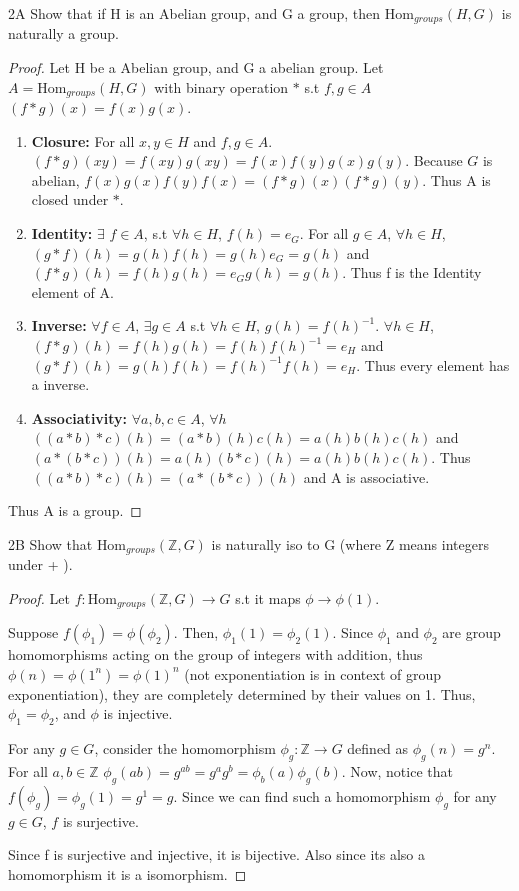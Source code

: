 \documentclass{article}
\newcommand{\Z}{\mathbb{Z}}
\newcommand{\Hom}[0]{\text{Hom}}
\begin{document}
\bigskip

\begin{claim}{2A}
    Show that if H is an Abelian group, and G a group, then $\Hom_{groups}(H,G)$ is naturally a group. 
\end{claim}
\begin{proof}
    Let H be a Abelian group, and G a abelian group. Let $A = \Hom_{groups}(H,G)$ with binary operation $\ast$ s.t $f, g \in A$ $(f \ast g)(x) = f(x)g(x)$. 
    
    \begin{enumerate}{}
        \item \textbf{Closure: } For all $x, y \in H$ and $f, g \in A$. $(f \ast g)(xy) = f(xy)g(xy) = f(x)f(y)g(x)g(y)$. Because $G$ is abelian, $f(x)g(x)f(y)f(x) = (f \ast g)(x)(f\ast g)(y)$. Thus A is closed under $\ast$.
        \item \textbf{Identity: } $\exists $ $f \in A$, s.t $\forall h \in H$, $f(h) = e_G$. For all $g \in A$, $\forall h \in H$, $(g \ast f)(h) = g(h)f(h) = g(h)e_G = g(h)$ and $(f \ast g)(h) = f(h)g(h) = e_G g(h)= g(h)$. Thus f is the Identity element of A.
        \item \textbf{Inverse: } $\forall f \in A$, $\exists g \in A$ s.t $\forall h \in H$, $g(h) = f(h)^{-1}$. $\forall h \in H$, $(f \ast g)(h) = f(h)g(h) = f(h)f(h)^{-1} = e_H$ and $(g \ast f)(h) = g(h)f(h) = f(h)^{-1}f(h) = e_H$. Thus every element has a inverse.
        \item \textbf{Associativity: } $\forall a, b, c \in A$, $\forall h$ $((a \ast b) \ast c)(h) = (a \ast b)(h)c(h) = a(h)b(h)c(h)$ and $(a \ast (b \ast c))(h) = a(h)(b \ast c)(h) =a(h)b(h)c(h)$. Thus $((a \ast b) \ast c)(h) =  (a \ast (b \ast c))(h)$ and A is associative.
    \end{enumerate}

    Thus A is a group.
\end{proof}
\begin{claim}{2B}
    Show that $\Hom_{groups}(\Z,G)$ is naturally iso to G (where Z means integers under + ).  
\end{claim}
\begin{proof}
    Let $f: \Hom_{groups}(\Z,G) \to G$ s.t it maps $\phi \to \phi(1)$.

    Suppose $f(\phi_1) = \phi(\phi_2)$. Then, $\phi_1(1) = \phi_2(1)$. Since $\phi_1$ and $\phi_2$ are group homomorphisms acting on the group of integers with addition, thus $\phi(n) = \phi(1^n) = \phi(1)^n$ (not exponentiation is in context of group exponentiation), they are completely determined by their values on 1. Thus, $\phi_1 = \phi_2$, and $\phi$ is injective.

    For any $g \in G$, consider the homomorphism $\phi_g: \Z \rightarrow G$ defined as $\phi_g(n) = g^n$. For all $a, b \in \Z$ $\phi_g(ab) = g^{ab} = g^ag^b=\phi_b(a)\phi_g(b)$. Now, notice that $f(\phi_g) = \phi_g(1) = g^1 = g$. Since we can find such a homomorphism $\phi_g$ for any $g \in G$, $f$ is surjective.

    Since f is surjective and injective, it is bijective. Also since its also a homomorphism it is a isomorphism.

\end{proof}
\end{document}
